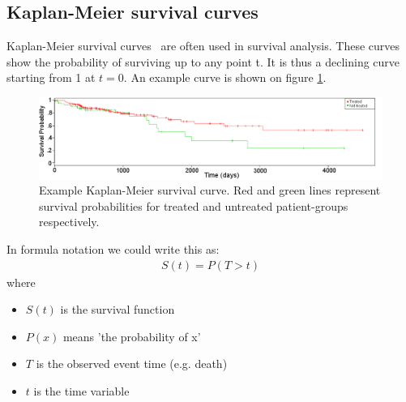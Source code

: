 \subsection{Kaplan-Meier survival curves}
\label{subsec:cox-km}
Kaplan-Meier survival curves~\cite{goel2010understanding} are often used in survival analysis. These curves show the probability of surviving up to any point t. It is thus a declining curve starting from 1 at $t=0$. An example curve is shown on figure \ref{fig:cox-example-kaplan-meier}.
\begin{figure}
	\centering
	\includegraphics[scale=0.4]{images/example_kaplan_meier_curve}
	\caption{Example Kaplan-Meier survival curve. Red and green lines represent survival probabilities for treated and untreated patient-groups respectively.}
	\label{fig:cox-example-kaplan-meier}
\end{figure}
In formula notation we could write this as:
\begin{equation}
\begin{split}
S(t) = P(T > t)
\end{split}
\end{equation}
where
\begin{itemize}
	\item $S(t)$ is the survival function
	\item $P(x)$ means 'the probability of x'
	\item $T$ is the observed event time (e.g. death)
	\item $t$ is the time variable
\end{itemize}
